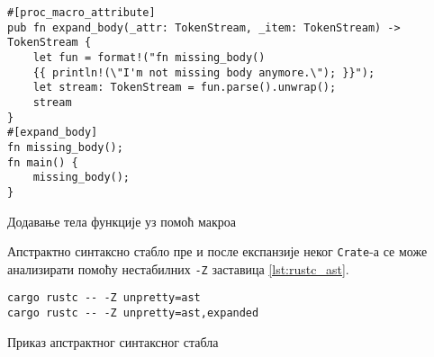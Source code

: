 \begin{listing}[H]
\begin{verbatim}
#[proc_macro_attribute]
pub fn expand_body(_attr: TokenStream, _item: TokenStream) -> TokenStream {
    let fun = format!("fn missing_body() 
    {{ println!(\"I'm not missing body anymore.\"); }}");
    let stream: TokenStream = fun.parse().unwrap();
    stream
}
#[expand_body]
fn missing_body();
fn main() {
    missing_body();
}
\end{verbatim}
\caption{Додавање тела функције уз помоћ макроа}
\label{lst:validate}
\end{listing}

Апстрактно синтаксно стабло пре и после експанзије неког \verb|Crate|-а се може анализирати помоћу 
нестабилних \verb|-Z| заставица \ref{lst:rustc_ast}.

\begin{listing}[H]
\begin{verbatim}
cargo rustc -- -Z unpretty=ast
cargo rustc -- -Z unpretty=ast,expanded
\end{verbatim}
\caption{Приказ апстрактног синтаксног стабла}
\label{lst:rustc_ast}
\end{listing}